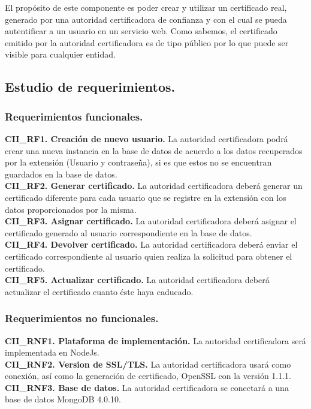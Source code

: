 \documentclass[12pt, a4paper, titlepage]{report}
\begin{document}
	        El propósito de este componente es poder crear y utilizar un certificado real, generado por una autoridad certificadora de confianza y con el cual se pueda autentificar a un usuario en un servicio web. Como sabemos, el certificado emitido por la autoridad certificadora es de tipo público por lo que puede ser visible para cualquier entidad.\\
	       
	        \subsection{Estudio de requerimientos.}
	            \subsubsection{Requerimientos funcionales.}
	            {\setlength{\parindent}{12pt}
				
				\textbf{CII\_RF1. Creación de nuevo usuario.} La autoridad certificadora podrá crear una nueva instancia en la base de datos de acuerdo a los datos recuperados por la extensión (Usuario y contraseña), si es que estos no se encuentran guardados en la base de datos.\\

				\textbf{CII\_RF2. Generar certificado.} La autoridad certificadora deberá generar un certificado diferente para cada usuario que se registre en la extensión con los datos proporcionados por la misma.\\
				
				\textbf{CII\_RF3. Asignar certificado.} La autoridad certificadora deberá asignar el certificado generado al usuario correspondiente en la base de datos.\\
				
				\textbf{CII\_RF4. Devolver certificado.} La autoridad certificadora deberá enviar el certificado correspondiente al usuario quien realiza la solicitud para obtener el certificado.\\
				
				\textbf{CII\_RF5. Actualizar certificado.} La autoridad certificadora deberá actualizar el certificado cuanto éste haya caducado.
                
		        }
		        
	            \subsubsection{Requerimientos no funcionales.}
	            {\setlength{\parindent}{12pt}
				
				\textbf{CII\_RNF1. Plataforma de implementación.} La autoridad certificadora será implementada en NodeJs.\\
				
				\textbf{CII\_RNF2. Version de SSL/TLS.} La autoridad certificadora usará como conexión, así como la generación de certificado, OpenSSL con la versión 1.1.1.\\
				
				\textbf{CII\_RNF3. Base de datos.} La autoridad certificadora se conectará a una base de datos MongoDB 4.0.10.\\
				
				}
	            
\end{document}
